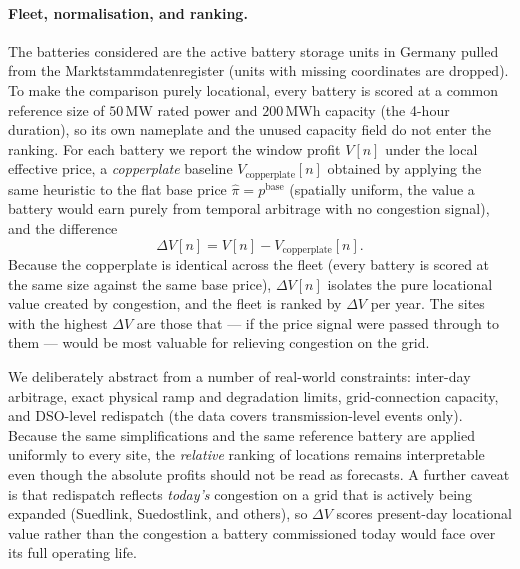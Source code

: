 \paragraph{Fleet, normalisation, and ranking.}
The batteries considered are the active battery storage units in Germany pulled from the Marktstammdatenregister (units with missing coordinates are dropped). To make the comparison purely locational, every battery is scored at a common reference size of $50\,\text{MW}$ rated power and $200\,\text{MWh}$ capacity (the 4-hour duration), so its own nameplate and the unused capacity field do not enter the ranking. For each battery we report the window profit $V[n]$ under the local effective price, a \emph{copperplate} baseline $V_{\text{copperplate}}[n]$ obtained by applying the same heuristic to the flat base price $\hat{\pi} = p^{\text{base}}$ (spatially uniform, the value a battery would earn purely from temporal arbitrage with no congestion signal), and the difference
\begin{equation}
\label{eq:delta_v}
\Delta V[n] = V[n] - V_{\text{copperplate}}[n].
\end{equation}
Because the copperplate is identical across the fleet (every battery is scored at the same size against the same base price), $\Delta V[n]$ isolates the pure locational value created by congestion, and the fleet is ranked by $\Delta V$ per year. The sites with the highest $\Delta V$ are those that --- if the price signal were passed through to them --- would be most valuable for relieving congestion on the grid.

We deliberately abstract from a number of real-world constraints: inter-day arbitrage, exact physical ramp and degradation limits, grid-connection capacity, and DSO-level redispatch (the data covers transmission-level events only). Because the same simplifications and the same reference battery are applied uniformly to every site, the \emph{relative} ranking of locations remains interpretable even though the absolute profits should not be read as forecasts. A further caveat is that redispatch reflects \emph{today's} congestion on a grid that is actively being expanded (Suedlink, Suedostlink, and others), so $\Delta V$ scores present-day locational value rather than the congestion a battery commissioned today would face over its full operating life.

